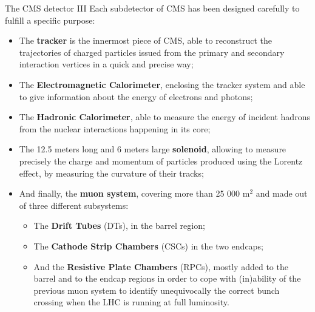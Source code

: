\documentclass[8pt]{beamer}
\begin{document}
\begin{frame}{The CMS detector III}
\justifying
Each subdetector of CMS has been \alert{designed carefully to fulfill a specific purpose}:

\begin{itemize}
\justifying
\item The \textbf{tracker} is the innermost piece of CMS, able to reconstruct the trajectories of charged particles issued from the primary and secondary interaction vertices in a quick and precise way;
\item The \textbf{Electromagnetic Calorimeter}, enclosing the tracker system and able to give information about the energy of electrons and photons;
\item The \textbf{Hadronic Calorimeter}, able to measure the energy of incident hadrons from the nuclear interactions happening in its core;
\item The 12.5 meters long and 6 meters large \textbf{solenoid}, allowing to measure precisely the charge and momentum of particles produced using the Lorentz effect, by measuring the curvature of their tracks;
\item And finally, the \textbf{muon system}, covering more than 25 000 m$^2$ and made out of three different subsystems:

\begin{itemize}
\justifying
\item The \textbf{Drift Tubes} (DTs), in the barrel region;%
\item The \textbf{Cathode Strip Chambers} (CSCs) in the two endcaps;%
\item And the \textbf{Resistive Plate Chambers} (RPCs), mostly added to the barrel and to the endcap regions in order to cope with (in)ability of  the previous muon system to identify unequivocally the correct bunch crossing when the LHC is running at full luminosity.
\end{itemize}

\end{itemize}
\end{frame}
\end{document}
